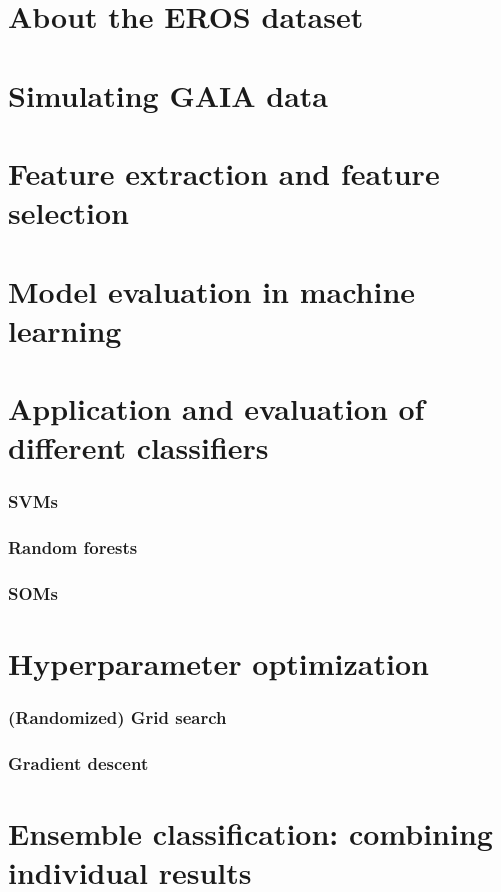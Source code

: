 \section{About the EROS dataset}
\section{Simulating GAIA data}
\section{Feature extraction and feature selection}
\section{Model evaluation in machine learning}


\section{Application and evaluation of different classifiers}
\subsubsection{SVMs}
\subsubsection{Random forests}
\subsubsection{SOMs}

\section{Hyperparameter optimization}
\subsubsection{(Randomized) Grid search}
\subsubsection{Gradient descent}

\section{Ensemble classification: combining individual results}

